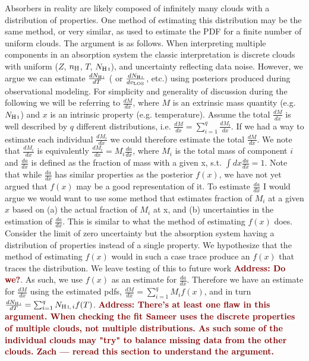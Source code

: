 \documentclass[fleqn,usenatbib]{mnras}
\newcommand{\todo}[1]{\textcolor{Maroon}{\textbf{Address: #1}}}
\newcommand{\NHI}{N_{\ion{H}{I}}}
\begin{document}
Absorbers in reality are likely composed of infinitely many clouds with a distribution of properties.
One method of estimating this distribution may be the same method, or very similar, as used to estimate the PDF for a finite number of uniform clouds.
The argument is as follows.
When interpreting multiple components in an absorption system the classic interpretation is discrete clouds with uniform ($Z$, $n_{\rm H}$, $T$, $\NHI$), and uncertainty reflecting data noise.
However, we argue we can estimate $\frac{d\NHI}{dT}$ ( or $\frac{d\NHI}{dv_{\rm LOS}}$, etc.) using posteriors produced during observational modeling.
For simplicity and generality of discussion during the following we will be referring to $\frac{dM}{dx}$, where $M$ is an extrinsic mass quantity (e.g. $\NHI$) and $x$ is an intrinsic property (e.g. temperature).
Assume the total $\frac{dM}{dx}$ is well described by $q$ different distributions, i.e. $\frac{dM}{dx} = \sum_{i=1}^{q} \frac{dM_i}{dx}$.
If we had a way to estimate each individual $\frac{dM_i}{dx}$ we could therefore estimate the total $\frac{dM}{dx}$.
We note that $\frac{dM_i}{dx}$ is equivalently $\frac{dM_i}{dx} = M_i \frac{da}{dx}$, where $M_i$ is the total mass of component $i$ and $\frac{da}{dx}$ is defined as the fraction of mass with a given x, s.t. $\int dx \frac{da}{dx} = 1$.
Note that while $\frac{da}{dx}$ has similar properties as the posterior $f(x)$, we have not yet argued that $f(x)$ may be a good representation of it.
To estimate $\frac{da}{dx}$ I would argue we would want to use some method that estimates fraction of $M_i$ at a given $x$ based on
(a) the actual fraction of $M_i$ at x, and
(b) uncertainties in the estimation of $\frac{da}{dx}$.
This is similar to what the method of estimating $f(x)$ does.
Consider the limit of zero uncertainty but the absorption system having a distribution of properties instead of a single property.
We hypothesize that the method of estimating $f(x)$ would in such a case trace produce an $f(x)$ that traces the distribution.
We leave testing of this to future work \todo{Do we?}.
As such, we use $f(x)$ as an estimate for $\frac{da}{dx}$. Therefore we have an estimate for $\frac{dM}{dx}$ using the estimated pdfs,
$\frac{dM}{dx} = \sum_{i=1}^{q} M_i f(x)$, and in turn $\frac{d\NHI}{dT} = \sum_{i=1}^{q} N_{\ion{H}{I},\,i} f(T)$.
\todo{There's at least one flaw in this argument.
When checking the fit Sameer uses the discrete properties of multiple clouds, not multiple distributions.
As such some of the individual clouds may "try" to balance missing data from the other clouds.
Zach --- reread this section to understand the argument.
}
\end{document}
